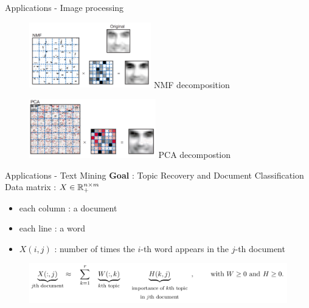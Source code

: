 \begin{frame}{Applications - Image processing}
    \begin{figure}[h!]
        \centering
        \begin{minipage}{0.45\textwidth}
            \centering
            \includegraphics[width=5.3cm]{NMFcomp.png}
            NMF decomposition
        \end{minipage}
        \hfill
        \begin{minipage}{0.45\textwidth}
            \centering
            \includegraphics[width=5.5cm]{PCAcomp.png}
            PCA decompostion
        \end{minipage}
    \end{figure}
\end{frame}
\begin{frame}{Applications - Text Mining}
    \textbf{Goal} : Topic Recovery and Document Classification\\
    \vspace{0.7cm}
    Data matrix : $X\in\mathbb{R}^{n\times m}_+$\\
    \begin{itemize}
        \item each column : a document
        \item each line : a word
        \item $X(i,j)$ : number of times the $i$-th word appears in the $j$-th document
    \end{itemize}
    \begin{figure}
        \centering
        \includegraphics[width=0.9\linewidth]{NMF_app2.png}
    \end{figure}
\end{frame}
